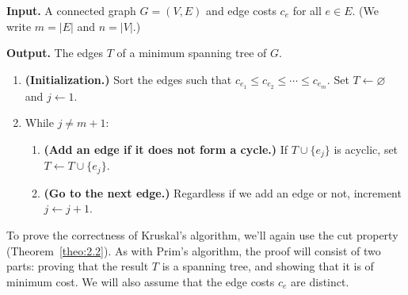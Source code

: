 \begin{mdframed}[
    linewidth=1pt,
    linecolor=black,
    bottomline=false,topline=false,rightline=false,
    innerrightmargin=0pt,innertopmargin=0pt,innerbottommargin=0pt,
    innerleftmargin=1em,%
    skipabove=0.75\baselineskip
]
{\bf Input.} A connected graph $G = (V, E)$ and edge costs $c_e$ for 
all $e \in E$. (We write $m = |E|$ and $n = |V|$.)

{\bf Output.} The edges $T$ of a minimum spanning tree of $G$.
\begin{enumerate}[leftmargin=1.75cm, label={Step \arabic*.}]
    \item {\bf (Initialization.)} Sort the edges such that 
    $c_{e_1} \leq c_{e_2} \leq \cdots \leq c_{e_m}$. 
    Set $T \gets \varnothing$ and $j \gets 1$. 

    \item While $j \neq m+1$:
    \begin{enumerate}[label={}]
        \item {\bf (Add an edge if it does not form a cycle.)} 
        If $T \cup \{e_j\}$ is acyclic, set $T \gets T \cup \{e_j\}$. 
        \item {\bf (Go to the next edge.)} Regardless if we add an edge or not, 
        increment $j \gets j+1$. 
    \end{enumerate}
\end{enumerate}
\end{mdframed}\vspace{-0.15cm}

To prove the correctness of Kruskal's algorithm, we'll again use the cut 
property (Theorem~\ref{theo:2.2}). As with Prim's algorithm, the proof will 
consist of two parts: proving that the result $T$ is a spanning tree, and showing 
that it is of minimum cost. We will also assume that the edge costs $c_e$ are 
distinct. 

